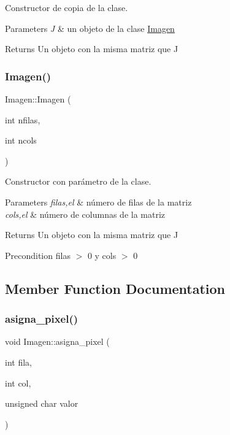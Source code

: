 Constructor de copia de la clase. 


\begin{DoxyParams}{Parameters}
{\em J} & un objeto de la clase \hyperlink{classImagen}{Imagen} \\
\hline
\end{DoxyParams}
\begin{DoxyReturn}{Returns}
Un objeto con la misma matriz que J 
\end{DoxyReturn}
\mbox{\label{classImagen_a9b34329ba89308633e8a8fe5627b50dc}} 
\subsubsection{\texorpdfstring{Imagen()}{Imagen()}\hspace{0.1cm}{\footnotesize\ttfamily [3/3]}}
{\footnotesize\ttfamily Imagen\+::\+Imagen (\begin{DoxyParamCaption}\item[{int}]{nfilas,  }\item[{int}]{ncols }\end{DoxyParamCaption})}



Constructor con parámetro de la clase. 


\begin{DoxyParams}{Parameters}
{\em filas,el} & número de filas de la matriz \\
\hline
{\em cols,el} & número de columnas de la matriz \\
\hline
\end{DoxyParams}
\begin{DoxyReturn}{Returns}
Un objeto con la misma matriz que J 
\end{DoxyReturn}
\begin{DoxyPrecond}{Precondition}
filas $>$ 0 y cols $>$ 0 
\end{DoxyPrecond}


\subsection{Member Function Documentation}
\mbox{\label{classImagen_abe7e36244d80a6ed5ebf952c557203d3}} 
\subsubsection{\texorpdfstring{asigna\+\_\+pixel()}{asigna\_pixel()}}
{\footnotesize\ttfamily void Imagen\+::asigna\+\_\+pixel (\begin{DoxyParamCaption}\item[{int}]{fila,  }\item[{int}]{col,  }\item[{unsigned char}]{valor }\end{DoxyParamCaption})}



